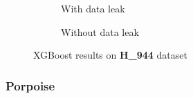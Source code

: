         \begin{figure}[H]
            \centering
            \begin{subfigure}{0.47\textwidth}
              \centering
              \resizebox{\textwidth}{!}{}
              \captionsetup{justification=centering}
              \caption{With data leak}
            \end{subfigure}%
            \hspace{0.05\textwidth}
            \begin{subfigure}{0.47\textwidth}
              \centering
              \resizebox{\textwidth}{!}{}
              \captionsetup{justification=centering}
              \caption{Without data leak}
            \end{subfigure}
            \caption{XGBoost results on \textbf{H\_944} dataset}\label{fig:xgb_m944}
        \end{figure}

    \subsubsection{Porpoise \cite{li_porpoise_2021}}
